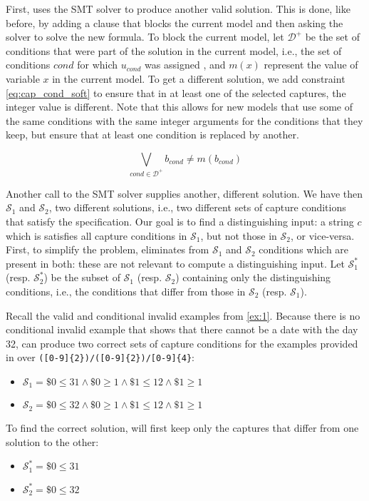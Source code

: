 First, \Forest uses the \ac{SMT} solver to produce another valid solution. This is done, like before, by adding a clause that blocks the current model and then asking the solver to solve the new formula.
%
To block the current model, let \(\mathcal{D^+}\) be the set of conditions that were part of the solution in the current model, i.e., the set of conditions \(\textit{cond}\) for which \(u_{\textit{cond}}\) was assigned \true, and \(m(x)\) represent the value of variable \(x\) in the current model.
To get a different solution, we add constraint \ref{eq:cap_cond_soft} to ensure that in at least one of the selected captures, the integer value is different. Note that this allows for new models that use some of the same conditions with the same integer arguments for the conditions that they keep, but ensure that at least one condition is replaced by another.

\begin{equation}\label{eq:cap_cond_soft}
\bigvee_{\textit{cond} \in \mathcal{D^+}} b_{\textit{cond}} \ne m(b_{\textit{cond}})
\end{equation}

Another call to the \ac{SMT} solver supplies another, different solution. We have then \(\mathcal{S}_1\) and \(\mathcal{S}_2\), two different solutions, i.e., two different sets of capture conditions that satisfy the specification. Our goal is to find a distinguishing input: a string \(c\) which is satisfies all capture conditions in \(\mathcal{S}_1\), but not those in \(\mathcal{S}_2\), or vice-versa. First, to simplify the problem, \Forest eliminates from \(\mathcal{S}_1\) and \(\mathcal{S}_2\) conditions which are present in both: these are not relevant to compute a distinguishing input. Let \(\mathcal{S}_1^*\) (resp. \(\mathcal{S}_2^*\)) be the subset of \(\mathcal{S}_1\) (resp. \(\mathcal{S}_2\)) containing only the distinguishing conditions, i.e., the conditions that differ from those in  \(\mathcal{S}_2\) (resp. \(\mathcal{S}_1\)).

\begin{example}\label{ex:cond_cap_keep_distinct}
Recall the valid and conditional invalid examples from \autoref{ex:1}. Because there is no conditional invalid example that shows that there cannot be a date with the day 32, \Forest can produce two correct sets of capture conditions for the examples provided in  over \verb`([0-9]{2})/([0-9]{2})/[0-9]{4}`:
\begin{itemize}[nosep]
    \item \(\mathcal{S}_1 = \$0 \le 31 \wedge \$0 \ge 1 \wedge \$1 \le 12 \wedge \$1 \ge 1\)
    \item \(\mathcal{S}_2 = \$0 \le 32 \wedge \$0 \ge 1 \wedge \$1 \le 12 \wedge \$1 \ge 1\)
\end{itemize}
To find the correct solution, \Forest will first keep only the captures that differ from one solution to the other:
\begin{itemize}[nosep]
    \item \(\mathcal{S}_1^* = \$0 \le 31\)
    \item \(\mathcal{S}_2^* = \$0 \le 32\)
\end{itemize}
\end{example}

